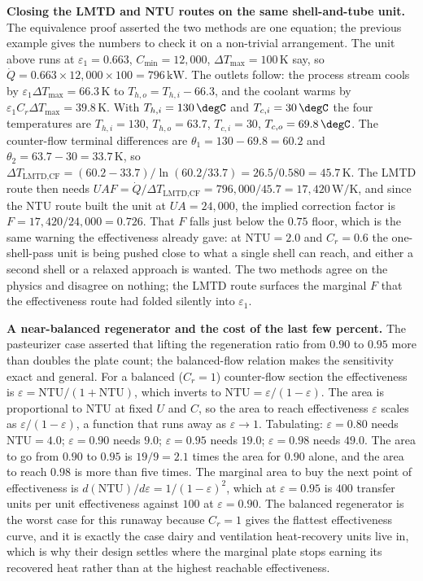 \textbf{Closing the LMTD and NTU routes on the same shell-and-tube unit.} The
equivalence proof asserted the two methods are one equation; the previous example
gives the numbers to check it on a non-trivial arrangement. The unit above runs at
$\varepsilon_1 = 0.663$, $C_{\min} = 12{,}000$, $\Delta T_{\max} = 100\,\si{
\kelvin}$ say, so $\dot{Q} = 0.663\times 12{,}000\times 100 = 796\,\text{kW}$. The
outlets follow: the process stream cools by $\varepsilon_1\Delta T_{\max} = 66.3\,
\si{\kelvin}$ to $T_{h,o} = T_{h,i} - 66.3$, and the coolant warms by
$\varepsilon_1 C_r\Delta T_{\max} = 39.8\,\si{\kelvin}$. With $T_{h,i} = 130\,
\degC$ and $T_{c,i} = 30\,\degC$ the four temperatures are $T_{h,i} = 130$,
$T_{h,o} = 63.7$, $T_{c,i} = 30$, $T_{c,o} = 69.8\,\degC$. The counter-flow
terminal differences are $\theta_1 = 130 - 69.8 = 60.2$ and $\theta_2 = 63.7 - 30
= 33.7\,\si{\kelvin}$, so $\Delta T_{\text{LMTD,CF}} = (60.2 - 33.7)/\ln(60.2/
33.7) = 26.5/0.580 = 45.7\,\si{\kelvin}$. The LMTD route then needs $UAF = \dot{Q}
/\Delta T_{\text{LMTD,CF}} = 796{,}000/45.7 = 17{,}420\,\text{W}/\si{\kelvin}$, and
since the NTU route built the unit at $UA = 24{,}000$, the implied correction
factor is $F = 17{,}420/24{,}000 = 0.726$. That $F$ falls just below the $0.75$
floor, which is the same warning the effectiveness already gave: at $\text{NTU} =
2.0$ and $C_r = 0.6$ the one-shell-pass unit is being pushed close to what a single
shell can reach, and either a second shell or a relaxed approach is wanted. The two
methods agree on the physics and disagree on nothing; the LMTD route surfaces the
marginal $F$ that the effectiveness route had folded silently into $\varepsilon_1$.

\textbf{A near-balanced regenerator and the cost of the last few percent.} The
pasteurizer case asserted that lifting the regeneration ratio from $0.90$ to
$0.95$ more than doubles the plate count; the balanced-flow relation makes the
sensitivity exact and general. For a balanced ($C_r = 1$) counter-flow section the
effectiveness is $\varepsilon = \text{NTU}/(1 + \text{NTU})$, which inverts to
$\text{NTU} = \varepsilon/(1 - \varepsilon)$. The area is proportional to NTU at
fixed $U$ and $C$, so the area to reach effectiveness $\varepsilon$ scales as
$\varepsilon/(1 - \varepsilon)$, a function that runs away as $\varepsilon \to 1$.
Tabulating: $\varepsilon = 0.80$ needs $\text{NTU} = 4.0$; $\varepsilon = 0.90$
needs $9.0$; $\varepsilon = 0.95$ needs $19.0$; $\varepsilon = 0.98$ needs $49.0$.
The area to go from $0.90$ to $0.95$ is $19/9 = 2.1$ times the area for $0.90$
alone, and the area to reach $0.98$ is more than five times. The marginal area to
buy the next point of effectiveness is $d(\text{NTU})/d\varepsilon = 1/(1 -
\varepsilon)^2$, which at $\varepsilon = 0.95$ is $400$ transfer units per unit
effectiveness against $100$ at $\varepsilon = 0.90$. The balanced regenerator is
the worst case for this runaway because $C_r = 1$ gives the flattest effectiveness
curve, and it is exactly the case dairy and ventilation heat-recovery units live
in, which is why their design settles where the marginal plate stops earning its
recovered heat rather than at the highest reachable effectiveness.

